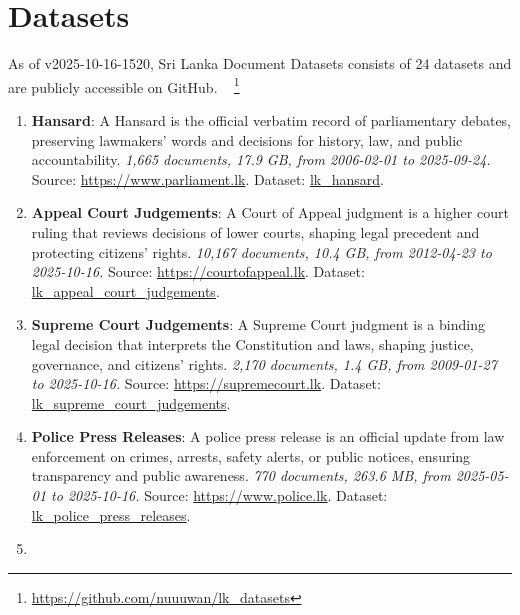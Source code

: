 \documentclass[10pt,a4paper]{article}%
\begin{document}
%
\section{Datasets}%
\label{sec:Datasets}%
As of v2025-10-16-1520, Sri Lanka Document Datasets
  consists of 24 datasets
 and are publicly accessible on GitHub.%
~%
\footnote{\href{https://github.com/nuuuwan/lk\_datasets}{https://github.com/nuuuwan/lk\_datasets}}%

%
\begin{enumerate}%
\item%
\textbf{Hansard}: A Hansard is the official verbatim record of parliamentary debates, preserving lawmakers’ words and decisions for history, law, and public accountability.\textit{ 1,665 documents, 17.9 GB, from 2006{-}02{-}01 to 2025{-}09{-}24.} Source: \href{https://www.parliament.lk}{https://www.parliament.lk}. Dataset: \href{https://github.com/nuuuwan/lk\_hansard/tree/data/data/lk\_hansard}{lk\_hansard}.%
\item%
\textbf{Appeal Court Judgements}: A Court of Appeal judgment is a higher court ruling that reviews decisions of lower courts, shaping legal precedent and protecting citizens’ rights.\textit{ 10,167 documents, 10.4 GB, from 2012{-}04{-}23 to 2025{-}10{-}16.} Source: \href{https://courtofappeal.lk}{https://courtofappeal.lk}. Dataset: \href{https://github.com/nuuuwan/lk\_appeal\_court\_judgements/tree/data/data/lk\_appeal\_court\_judgements}{lk\_appeal\_court\_judgements}.%
\item%
\textbf{Supreme Court Judgements}: A Supreme Court judgment is a binding legal decision that interprets the Constitution and laws, shaping justice, governance, and citizens’ rights.\textit{ 2,170 documents, 1.4 GB, from 2009{-}01{-}27 to 2025{-}10{-}16.} Source: \href{https://supremecourt.lk}{https://supremecourt.lk}. Dataset: \href{https://github.com/nuuuwan/lk\_supreme\_court\_judgements/tree/data/data/lk\_supreme\_court\_judgements}{lk\_supreme\_court\_judgements}.%
\item%
\textbf{Police Press Releases}: A police press release is an official update from law enforcement on crimes, arrests, safety alerts, or public notices, ensuring transparency and public awareness.\textit{ 770 documents, 263.6 MB, from 2025{-}05{-}01 to 2025{-}10{-}16.} Source: \href{https://www.police.lk}{https://www.police.lk}. Dataset: \href{https://github.com/nuuuwan/lk\_police\_press\_releases/tree/data/data/lk\_police\_press\_releases}{lk\_police\_press\_releases}.%
\item%

\end{enumerate}
\end{document}
